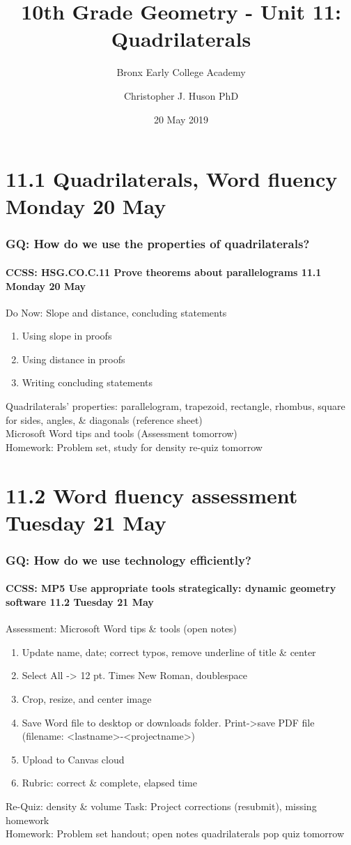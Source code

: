 \documentclass{beamer}
\title{10th Grade Geometry - Unit 11: Quadrilaterals}
\subtitle{Bronx Early College Academy}
\author{Christopher J. Huson PhD}
\date{20 May 2019}
\begin{document}
\frame{\titlepage}
\section[Outline]{}
\frame{\tableofcontents}


\section{11.1 Quadrilaterals, Word fluency Monday 20 May}
  \frame
  {
    \frametitle{GQ: How do we use the properties of quadrilaterals?}
    \framesubtitle{CCSS: HSG.CO.C.11 Prove theorems about parallelograms \hfill \alert{11.1 Monday 20 May}}

    \begin{block}{Do Now: Slope and distance, concluding statements}
      \begin{enumerate}
        \item Using slope in proofs
        \item Using distance in proofs
        \item Writing concluding statements
      \end{enumerate}
    \end{block}
    Quadrilaterals' properties: parallelogram, trapezoid, rectangle, rhombus, square for sides, angles, \& diagonals (reference sheet)\\[0.25cm]
    Microsoft Word tips and tools \alert{(Assessment tomorrow)}\\[0.25cm]
    Homework: Problem set, study for density re-quiz \alert{tomorrow}
  }

\section{11.2 Word fluency assessment Tuesday 21 May}
  \frame
  {
    \frametitle{GQ: How do we use technology efficiently?}
    \framesubtitle{CCSS: MP5 Use appropriate tools strategically: dynamic geometry software \hfill \alert{11.2 Tuesday 21 May}}

    \begin{block}{Assessment: Microsoft Word tips \& tools (open notes)}
      \begin{enumerate}
        \item Update name, date; correct typos, remove underline of title \& center
        \item Select All -> 12 pt. Times New Roman, doublespace
        \item Crop, resize, and center image
        \item Save Word file to desktop or downloads folder. Print->save PDF file (filename: <lastname>-<projectname>)
        \item Upload to Canvas cloud
        \item Rubric: correct \& complete, elapsed time
      \end{enumerate}
    \end{block}
    Re-Quiz: density \& volume
    Task: Project corrections (resubmit), missing homework\\
    Homework: Problem set handout; open notes quadrilaterals pop quiz tomorrow
      }
\end{document}
